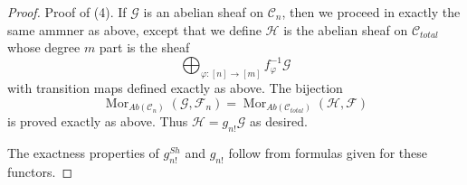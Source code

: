 \documentclass{stacks-project}
\theoremstyle{plain}
\theoremstyle{definition}
\theoremstyle{remark}
\numberwithin{equation}{subsection}
\def\Mor{\mathop{\mathrm{Mor}}\nolimits}
\begin{document}
\begin{proof}
\medskip\noindent
Proof of (4). If $\mathcal{G}$ is an abelian sheaf on $\mathcal{C}_n$,
then we proceed in exactly the same ammner as above, except that
we define $\mathcal{H}$ is the abelian sheaf on $\mathcal{C}_{total}$
whose degree $m$ part is the sheaf
$$
\bigoplus\nolimits_{\varphi : [n] \to [m]} f_\varphi^{-1}\mathcal{G}
$$
with transition maps defined exactly as above. The bijection
$$
\Mor_{\textit{Ab}(\mathcal{C}_n)}(\mathcal{G}, \mathcal{F}_n) =
\Mor_{\textit{Ab}(\mathcal{C}_{total})}(\mathcal{H}, \mathcal{F})
$$
is proved exactly as above.
Thus $\mathcal{H} = g_{n!}\mathcal{G}$ as desired.

\medskip\noindent
The exactness properties of $g^{Sh}_{n!}$ and $g_{n!}$ follow
from formulas given for these functors.
\end{proof}
\end{document}
